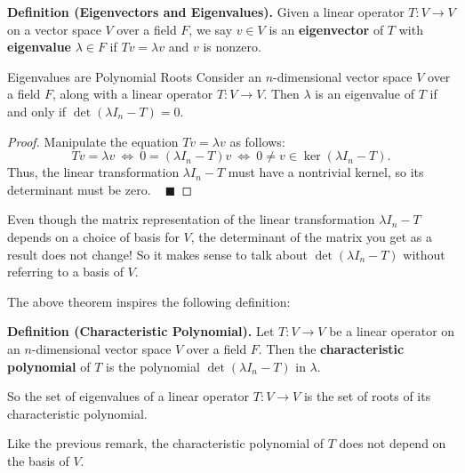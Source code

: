 \textbf{Definition (Eigenvectors and Eigenvalues).} Given a linear operator $T: V \to V$ on a vector space $V$ over a field $F$, we say $v \in V$ is an \textbf{eigenvector} of $T$ with \textbf{eigenvalue} $\lambda \in F$ if $Tv = \lambda v$ and $v$ is nonzero.

\begin{theorem}{Eigenvalues are Polynomial Roots}
    Consider an $n$-dimensional vector space $V$ over a field $F$, along with a linear operator $T: V \to V$.  Then $\lambda$ is an eigenvalue of $T$ if and only if $\det (\lambda I_n - T)  = 0$.
\end{theorem}

\begin{proof}
    Manipulate the equation $Tv = \lambda v$ as follows:
    \[ Tv = \lambda v ~ \iff ~ 0 = (\lambda I_n - T)v ~ \iff ~ 0 \neq v \in \ker(\lambda I_n - T). \]
    Thus, the linear transformation $\lambda I_n - T$ must have a nontrivial kernel, so its determinant must be zero. ~ $\blacksquare$
\end{proof}

\begin{remark}
    Even though the matrix representation of the linear transformation $\lambda I_n - T$ depends on a choice of basis for $V$, the determinant of the matrix you get as a result does not change!  So it makes sense to talk about $\det (\lambda I_n - T)$ without referring to a basis of $V$.
\end{remark}

The above theorem inspires the following definition:

\textbf{Definition (Characteristic Polynomial).} Let $T: V \to V$ be a linear operator on an $n$-dimensional vector space $V$ over a field $F$.  Then the \textbf{characteristic polynomial} of $T$ is the polynomial $\det (\lambda I_n - T)$ in $\lambda$.

So the set of eigenvalues of a linear operator $T: V \to V$ is the set of roots of its characteristic polynomial.

\begin{remark}
    Like the previous remark, the characteristic polynomial of $T$ does not depend on the basis of $V$.
\end{remark}

